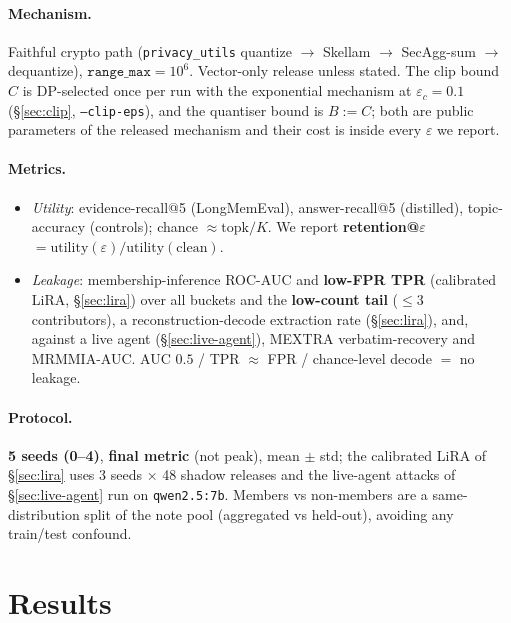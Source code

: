 \documentclass[pdflatex,sn-mathphys-num,iicol]{sn-jnl}
\theoremstyle{thmstyleone}%
\theoremstyle{thmstyletwo}%
\theoremstyle{thmstylethree}%
\newcommand{\eps}{\varepsilon}
\newcommand{\secref}[1]{\S\ref{#1}}
\begin{document}
\paragraph{Mechanism.} Faithful crypto path (\texttt{privacy\_utils} quantize $\to$
Skellam $\to$ SecAgg-sum $\to$ dequantize), $\texttt{range\_max} = 10^{6}$. Vector-only
release unless stated. The clip bound $C$ is DP-selected once per run with the
exponential mechanism at $\eps_c = 0.1$ (\secref{sec:clip}, \texttt{--clip-eps}), and the
quantiser bound is $B := C$; both are public parameters of the released mechanism and
their cost is inside every $\eps$ we report.

\paragraph{Metrics.}
\begin{itemize}
  \item \emph{Utility}: evidence-recall@5 (LongMemEval), answer-recall@5 (distilled),
    topic-accuracy (controls); chance $\approx \mathrm{topk}/K$. We report
    \textbf{retention@$\eps$} $= \mathrm{utility}(\eps) / \mathrm{utility}(\text{clean})$.
  \item \emph{Leakage}: membership-inference ROC-AUC and \textbf{low-FPR TPR}
    (calibrated LiRA, \secref{sec:lira}) over all buckets and the \textbf{low-count tail}
    ($\leq 3$ contributors), a reconstruction-decode extraction rate
    (\secref{sec:lira}), and, against a live agent (\secref{sec:live-agent}), MEXTRA
    verbatim-recovery and MRMMIA-AUC. AUC $0.5$ / TPR $\approx$ FPR / chance-level decode
    $=$ no leakage.
\end{itemize}

\paragraph{Protocol.} \textbf{5 seeds (0--4)}, \textbf{final metric} (not peak),
mean $\pm$ std; the calibrated LiRA of \secref{sec:lira} uses 3 seeds $\times$ 48 shadow
releases and the live-agent attacks of \secref{sec:live-agent} run on
\texttt{qwen2.5:7b}. Members vs non-members are a same-distribution split of the note
pool (aggregated vs held-out), avoiding any train/test confound.

\section{Results}\label{sec:results}
\end{document}
